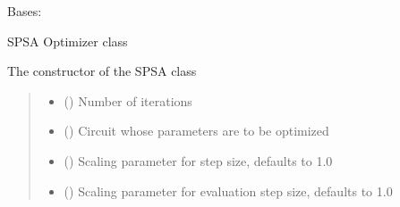 \documentclass[letterpaper,10pt,english]{sphinxmanual}
\begin{document}

\begin{fulllineitems}
\label{\detokenize{qcompute_qapp.optimizer:qcompute_qapp.optimizer.SPSA}}
\pysigstartsignatures
{}
\pysigstopsignatures
\sphinxAtStartPar
Bases: {\hyperref[\detokenize{qcompute_qapp.optimizer:qcompute_qapp.optimizer.BasicOptimizer}]{}}

\sphinxAtStartPar
SPSA Optimizer class

\sphinxAtStartPar
The constructor of the SPSA class
\begin{quote}\begin{description}
\begin{itemize}
\item {} 
\sphinxAtStartPar
{} () \textendash{} Number of iterations

\item {} 
\sphinxAtStartPar
{} ({\hyperref[\detokenize{qcompute_qapp.circuit:qcompute_qapp.circuit.BasicCircuit}]{}}) \textendash{} Circuit whose parameters are to be optimized

\item {} 
\sphinxAtStartPar
{} () \textendash{} Scaling parameter for step size, defaults to 1.0

\item {} 
\sphinxAtStartPar
{} () \textendash{} Scaling parameter for evaluation step size, defaults to 1.0


\end{itemize}
\end{description}
\end{quote}
\end{fulllineitems}
\end{document}
